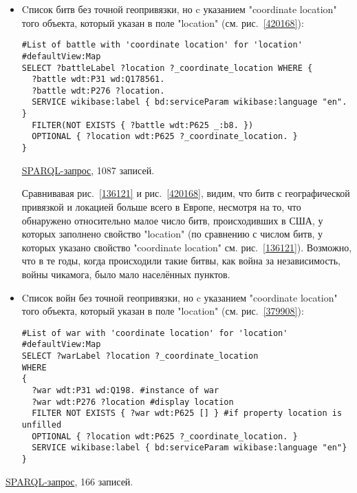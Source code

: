 \begin{itemize}
\item{Cписок битв без точной геопривязки, но c указанием "coordinate location" того объекта, который указан в поле "location" (см. рис.~\ref{420168}):} 
\begin{lstlisting}[language=SPARQL]
#List of battle with 'coordinate location' for 'location'
#defaultView:Map
SELECT ?battleLabel ?location ?_coordinate_location WHERE {
  ?battle wdt:P31 wd:Q178561.
  ?battle wdt:P276 ?location.
  SERVICE wikibase:label { bd:serviceParam wikibase:language "en". }
  FILTER(NOT EXISTS { ?battle wdt:P625 _:b8. })
  OPTIONAL { ?location wdt:P625 ?_coordinate_location. }
}
\end{lstlisting}
\href{https://query.wikidata.org/#%23List%20of%20battle%20with%20%27coordinate%20location%27%20%0A%23defaultView%3AMap%0ASELECT%20%3FbattleLabel%20%3Flocation%20%3F_coordinate_location%20WHERE%20%7B%0A%20%20%3Fbattle%20wdt%3AP31%20wd%3AQ178561.%0A%20%20%3Fbattle%20wdt%3AP276%20%3Flocation.%0A%20%20SERVICE%20wikibase%3Alabel%20%7B%20bd%3AserviceParam%20wikibase%3Alanguage%20%22en%22.%20%7D%0A%20%20FILTER%28NOT%20EXISTS%20%7B%20%3Fbattle%20wdt%3AP625%20_%3Ab8.%20%7D%29%0A%20%20OPTIONAL%20%7B%20%3Flocation%20wdt%3AP625%20%3F_coordinate_location.%20%7D%0A%7D}{ SPARQL-запрос}, 1087 записей.

Сравнивавая рис.~\ref{136121} и рис.~\ref{420168}, видим, что битв с географической привязкой и локацией больше всего в Европе, несмотря на то, что обнаружено относительно малое число битв, происходивших в США, у которых заполнено свойство "location" (по сравнению с числом битв, у которых указано свойство "coordinate location" см. рис.~\ref{136121}). Возможно, что в те годы, когда происходили такие битвы, как война за независимость, войны чикамога, было мало населённых пунктов.

\item{Cписок войн без точной геопривязки, но c указанием "coordinate location" того объекта, который указан в поле "location" (см. рис.~\ref{379908}):} 
\begin{lstlisting}[language=SPARQL]
#List of war with 'coordinate location' for 'location'
#defaultView:Map
SELECT ?warLabel ?location ?_coordinate_location
WHERE
{
  ?war wdt:P31 wd:Q198. #instance of war
  ?war wdt:P276 ?location #display location
  FILTER NOT EXISTS { ?war wdt:P625 [] } #if property location is unfilled
  OPTIONAL { ?location wdt:P625 ?_coordinate_location. }
  SERVICE wikibase:label { bd:serviceParam wikibase:language "en"}
}
\end{lstlisting}
\end{itemize}
\href{https://query.wikidata.org/#%23List%20of%20war%20with%20unfilled%20property%20%27location%27%20%0A%23defaultView%3AMap%0ASELECT%20%3FwarLabel%20%3Flocation%20%3F_coordinate_location%0AWHERE%0A%7B%0A%20%20%3Fwar%20wdt%3AP31%20wd%3AQ198.%20%23instance%20of%20war%0A%20%20%3Fwar%20wdt%3AP276%20%3Flocation%20%23display%20location%0A%20%20FILTER%20NOT%20EXISTS%20%7B%20%3Fwar%20wdt%3AP625%20%5B%5D%20%7D%20%23if%20property%20location%20is%20unfilled%0A%20%20OPTIONAL%20%7B%20%3Flocation%20wdt%3AP625%20%3F_coordinate_location.%20%7D%0A%20%20SERVICE%20wikibase%3Alabel%20%7B%20bd%3AserviceParam%20wikibase%3Alanguage%20%22en%22%7D%0A%7D}{ SPARQL-запрос}, 166 записей.


